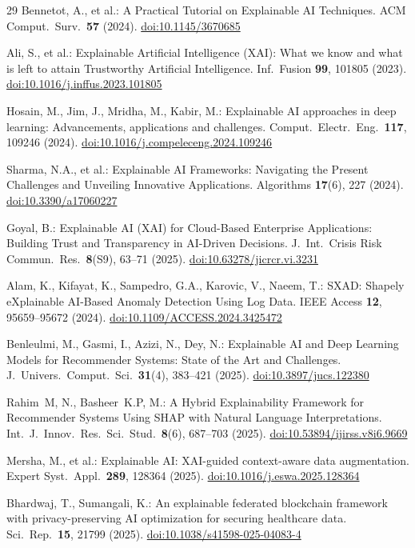 \documentclass{svproc}
\begin{document}
\begin{thebibliography}{29}
Bennetot, A., et al.: A Practical Tutorial on Explainable AI Techniques. ACM Comput.\ Surv.\ \textbf{57} (2024). \url{doi:10.1145/3670685}

Ali, S., et al.: Explainable Artificial Intelligence (XAI): What we know and what is left to attain Trustworthy Artificial Intelligence. Inf.\ Fusion \textbf{99}, 101805 (2023). \url{doi:10.1016/j.inffus.2023.101805}

Hosain, M., Jim, J., Mridha, M., Kabir, M.: Explainable AI approaches in deep learning: Advancements, applications and challenges. Comput.\ Electr.\ Eng.\ \textbf{117}, 109246 (2024). \url{doi:10.1016/j.compeleceng.2024.109246}

Sharma, N.A., et al.: Explainable AI Frameworks: Navigating the Present Challenges and Unveiling Innovative Applications. Algorithms \textbf{17}(6), 227 (2024). \url{doi:10.3390/a17060227}

Goyal, B.: Explainable AI (XAI) for Cloud-Based Enterprise Applications: Building Trust and Transparency in AI-Driven Decisions. J.\ Int.\ Crisis Risk Commun.\ Res.\ \textbf{8}(S9), 63--71 (2025). \url{doi:10.63278/jicrcr.vi.3231}

Alam, K., Kifayat, K., Sampedro, G.A., Karovic, V., Naeem, T.: SXAD: Shapely eXplainable AI-Based Anomaly Detection Using Log Data. IEEE Access \textbf{12}, 95659--95672 (2024). \url{doi:10.1109/ACCESS.2024.3425472}

Benleulmi, M., Gasmi, I., Azizi, N., Dey, N.: Explainable AI and Deep Learning Models for Recommender Systems: State of the Art and Challenges. J.\ Univers.\ Comput.\ Sci.\ \textbf{31}(4), 383--421 (2025). \url{doi:10.3897/jucs.122380}

Rahim~M, N., Basheer~K.P, M.: A Hybrid Explainability Framework for Recommender Systems Using SHAP with Natural Language Interpretations. Int.\ J.\ Innov.\ Res.\ Sci.\ Stud.\ \textbf{8}(6), 687--703 (2025). \url{doi:10.53894/ijirss.v8i6.9669}

Mersha, M., et al.: Explainable AI: XAI-guided context-aware data augmentation. Expert Syst.\ Appl.\ \textbf{289}, 128364 (2025). \url{doi:10.1016/j.eswa.2025.128364}

Bhardwaj, T., Sumangali, K.: An explainable federated blockchain framework with privacy-preserving AI optimization for securing healthcare data. Sci.\ Rep.\ \textbf{15}, 21799 (2025). \url{doi:10.1038/s41598-025-04083-4}

\end{thebibliography}
\end{document}
